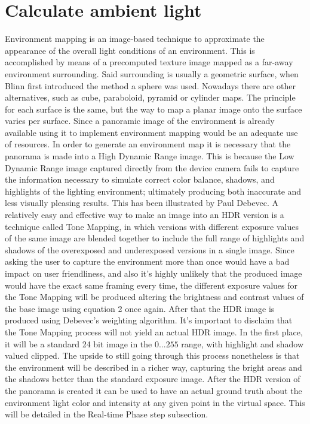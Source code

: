 \section{Calculate ambient light}
Environment mapping is an image-based technique to approximate the appearance of the overall light conditions of an environment. This is accomplished by means of a precomputed texture image mapped as a far-away environment surrounding. Said surrounding is usually a geometric surface, when Blinn first introduced the method\cite{Blinn76} a sphere was used. Nowadays there are other alternatives, such as cube, paraboloid, pyramid or cylinder maps. The principle for each surface is the same, but the way to map a planar image onto the surface varies per surface.\newline
Since a panoramic image of the environment is already available using it to implement environment mapping would be an adequate use of resources. In order to generate an environment map it is necessary that the panorama is made into a High Dynamic Range image. This is because the Low Dynamic Range image captured directly from the device camera fails to capture the information necessary to simulate correct color balance, shadows, and highlights of the lighting environment; ultimately producing both inaccurate and less visually pleasing results. This has been illustrated by Paul Debevec.\cite{DebevecRSO}\newline 
A relatively easy and effective way to make an image into an HDR version is a technique called Tone Mapping, in which versions with different exposure values of the same image are blended together to include the full range of highlights and shadows of the overexposed and underexposed versions in a single image. Since asking the user to capture the environment more than once would have a bad impact on user friendliness, and also it's highly unlikely that the produced image would have the exact same framing every time, the different exposure values for the Tone Mapping will be produced altering the brightness and contrast values of the base image using equation 2 once again. After that the HDR image is produced using Debevec's weighting algorithm\cite{Debevec}.\newline
It's important to disclaim that the Tone Mapping process will not yield an actual HDR image. In the first place, it will be a standard 24 bit image in the $0...255$ range, with highlight and shadow valued clipped. The upside to still going through this process nonetheless is that the environment will be described in a richer way, capturing the bright areas and the shadows better than the standard exposure image.\newline
After the HDR version of the panorama is created it can be used to have an actual ground truth about the environment light color and intensity at any given point in the virtual space. This will be detailed in the Real-time Phase step subsection.

